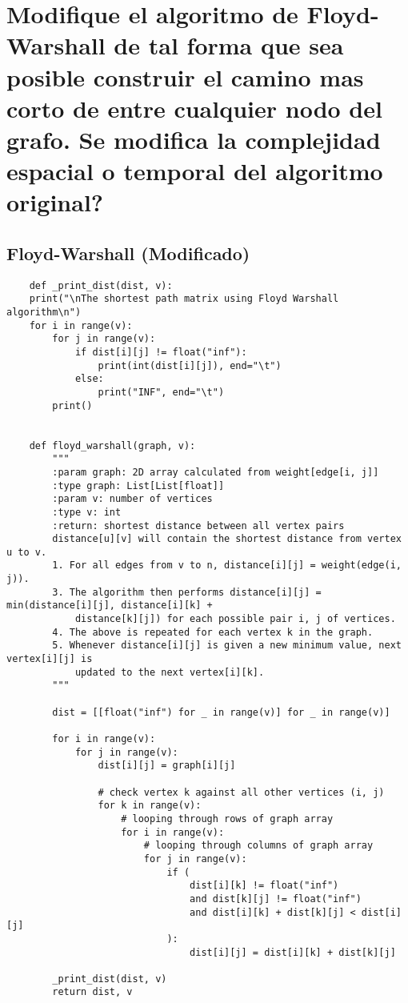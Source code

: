 \documentclass[a4paper]{article}
\begin{document}
\section{Modifique el algoritmo de Floyd-Warshall de tal forma que sea posible construir
el camino mas corto de entre cualquier nodo del grafo. Se modifica la complejidad
espacial o temporal del algoritmo original?}



\subsection{Floyd-Warshall (Modificado)}
\begin{verbatim}
    def _print_dist(dist, v):
    print("\nThe shortest path matrix using Floyd Warshall algorithm\n")
    for i in range(v):
        for j in range(v):
            if dist[i][j] != float("inf"):
                print(int(dist[i][j]), end="\t")
            else:
                print("INF", end="\t")
        print()


    def floyd_warshall(graph, v):
        """
        :param graph: 2D array calculated from weight[edge[i, j]]
        :type graph: List[List[float]]
        :param v: number of vertices
        :type v: int
        :return: shortest distance between all vertex pairs
        distance[u][v] will contain the shortest distance from vertex u to v.
        1. For all edges from v to n, distance[i][j] = weight(edge(i, j)).
        3. The algorithm then performs distance[i][j] = min(distance[i][j], distance[i][k] +
            distance[k][j]) for each possible pair i, j of vertices.
        4. The above is repeated for each vertex k in the graph.
        5. Whenever distance[i][j] is given a new minimum value, next vertex[i][j] is
            updated to the next vertex[i][k].
        """

        dist = [[float("inf") for _ in range(v)] for _ in range(v)]

        for i in range(v):
            for j in range(v):
                dist[i][j] = graph[i][j]
                
                # check vertex k against all other vertices (i, j)
                for k in range(v):
                    # looping through rows of graph array
                    for i in range(v):
                        # looping through columns of graph array
                        for j in range(v):
                            if (
                                dist[i][k] != float("inf")
                                and dist[k][j] != float("inf")
                                and dist[i][k] + dist[k][j] < dist[i][j]
                            ):
                                dist[i][j] = dist[i][k] + dist[k][j]

        _print_dist(dist, v)
        return dist, v
\end{verbatim}
\end{document}
